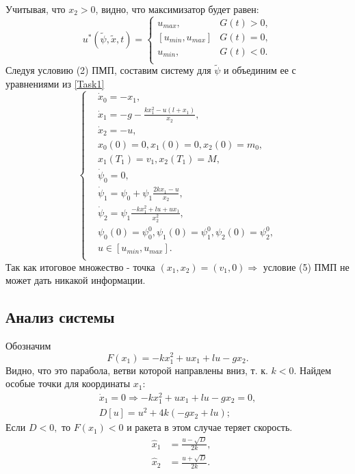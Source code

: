\documentclass[10pt,pdf,hyperref={unicode}]{beamer}
\begin{document}
	Учитывая, что $x_2 > 0$, видно, что максимизатор будет равен:
	\begin{equation*}
	u^*(\tilde \psi, \tilde x, t) = 
	\begin{cases}
	u_{max}, & G(t) > 0,\\
	\left[u_{min}, u_{max}\right] &G(t) = 0,\\
	u_{min}, & G(t) < 0.\\
	\end{cases}
	\end{equation*}
	Следуя условию (2) ПМП, составим систему для $\tilde \psi$ и объединим ее с уравнениями из \eqref{Task1}
	\begin{equation}\label{System1}
	\left\{
	\begin{aligned}
	& \dot x_0 = -x_1,\\
	& \dot x_1 = -g - \frac{k x_1^2 - u\left(l + x_1\right)}{x_2},\\
	& \dot x_2 = -u,\\
	& x_0(0) = 0, x_1(0) = 0, x_2(0) = m_0,\\
	& x_1(T_1) = v_1, x_2(T_1) = M,\\
	& \dot \psi_0 = 0, \\
	& \dot \psi_1 = \psi_0 + \psi_1\frac{2k x_1 - u}{x_2}, \\
	& \dot \psi_2 = \psi_1\frac{-kx_1^2 + lu + ux_1}{x_2^2},\\
	& \psi_0(0) = \psi_0^0, \psi_1(0) = \psi_1^0, \psi_2(0) = \psi_2^0,\\
	& u \in [u_{min}, u_{max}].\\
	\end{aligned}
	\right.
	\end{equation}
	Так как итоговое множество - точка $(x_1, x_2) = (v_1, 0) \Rightarrow$ условие (5) ПМП не может дать никакой информации.

	\subsection{Анализ системы}
	Обозначим 
	\[
	F(x_1) = -kx_1^2 + ux_1 + lu - gx_2.
	\]
	Видно, что это парабола, ветви которой направлены вниз, т. к. $k < 0.$
	Найдем особые точки для координаты $x_1:$
	\[
	\begin{aligned}
	\dot x_1 = 0 \Rightarrow -kx_1^2 + ux_1 + lu - gx_2 = 0,\\
	D[u] = u^2 + 4k(-gx_2 + lu);
	\end{aligned}
	\]
	Если $D < 0,$ то $F(x_1) < 0$ и ракета в этом случае теряет скорость.
	\[
	\begin{aligned}
	&\hat x_1 &= \frac{u - \sqrt{D}}{2k},\\
	&\hat x_2 &= \frac{u + \sqrt{D}}{2k}.\\
	\end{aligned}
	\]
\end{document}
